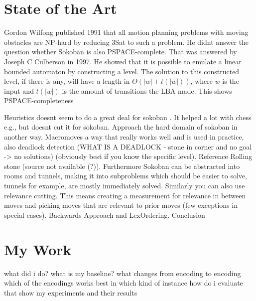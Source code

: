 \documentclass{article}
\begin{document}
\section{State of the Art}
Gordon Wilfong published 1991 that all motion planning problems with moving obstacles are NP-hard \cite{WilfongNPhard} by reducing 3Sat to such a problem. He didnt answer the question whether Sokoban is also PSPACE-complete. That was answered by Joseph C Culberson \cite{PSpaceComplete} in 1997. He showed that it is possible to emulate a linear bounded automaton by constructing a level. The solution to this constructed level, if there is any, will have a length in $\Theta (|w|+t(|w|))$, where $w$ is the input and $t(|w|)$ is the amount of transitions the LBA made. This shows PSPACE-completeness

Heuristics doesnt seem to do a great deal for sokoban \cite{BoteaHeuristicsVsPlanning}. It helped a lot with chess e.g., but doesnt cut it for sokoban. Approach the hard domain of sokoban in another way. Macromoves a way that really works well and is used in practice, also deadlock detection (WHAT IS A DEADLOCK - stone in corner and no goal -> no solutions) (obviously best if you know the specific level). Reference Rolling stone (source not available (?)). Furthermore Sokoban can be abstracted into rooms and tunnels, making it into subproblems which should be easier to solve, tunnels for example, are mostly immediately solved. Similarly you can also use relevance cutting. This means creating a measurement for relevance in between moves and picking moves that are relevant to prior moves (few exceptions in special cases).
Backwards Approach and LexOrdering.
Conclusion


\section{My Work}
what did i do?
what is my baseline?
what changes from encoding to encoding
which of the encodings works best in which kind of instance
how do i evaluate that
show my experiments and their results
\end{document}
